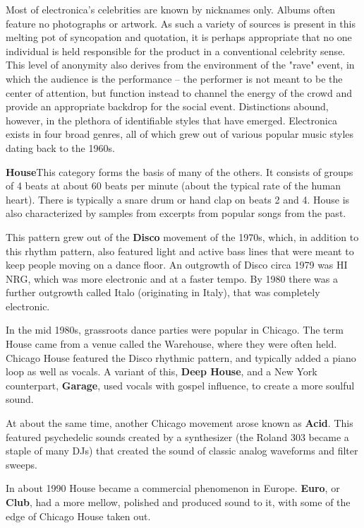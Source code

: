 Most of electronica's celebrities are known by nicknames only. Albums often feature no photographs or artwork. As such a variety of sources is present in this melting pot of syncopation and quotation, it is perhaps appropriate that no one individual is held responsible for the product in a conventional celebrity sense. This level of anonymity also derives from the environment of the "rave" event, in which the audience is the performance -- the performer is not meant to be the center of attention, but function instead to channel the energy of the crowd and provide an appropriate backdrop for the social event. Distinctions abound, however, in the plethora of identifiable styles that have emerged. Electronica exists in four broad genres, all of which grew out of various popular music styles dating back to the 1960s.

\textbf{House}This category forms the basis of many of the others. It consists of groups of 4 beats at about 60 beats per minute (about the typical rate of the human heart). There is typically a snare drum or hand clap on beats 2 and 4. House is also characterized by samples from excerpts from popular songs from the past.

This pattern grew out of the \textbf{Disco} movement of the 1970s, which, in addition to this rhythm pattern, also featured light and active bass lines that were meant to keep people moving on a dance floor. An outgrowth of Disco circa 1979 was HI NRG, which was more electronic and at a faster tempo. By 1980 there was a further outgrowth called Italo (originating in Italy), that was completely electronic.

In the mid 1980s, grassroots dance parties were popular in Chicago. The term House came from a venue called the Warehouse, where they were often held. Chicago House featured the Disco rhythmic pattern, and typically added a piano loop as well as vocals. A variant of this, \textbf{Deep House}, and a New York counterpart, \textbf{Garage}, used vocals with gospel influence, to create a more soulful sound.

At about the same time, another Chicago movement arose known as \textbf{Acid}. This featured psychedelic sounds created by a synthesizer (the Roland 303 became a staple of many DJs) that created the sound of classic analog waveforms and filter sweeps.

In about 1990 House became a commercial phenomenon in Europe. \textbf{Euro}, or \textbf{Club}, had a more mellow, polished and produced sound to it, with some of the edge of Chicago House taken out.


